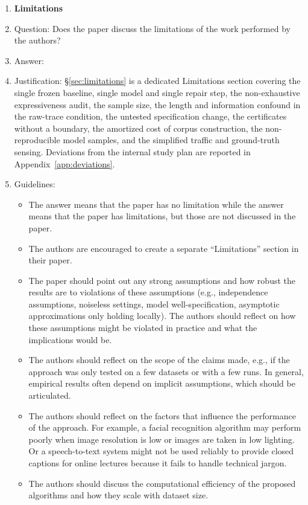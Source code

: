 \begin{enumerate}
\item {\bf Limitations}
    \item[] Question: Does the paper discuss the limitations of the work performed by the authors?
    \item[] Answer: \answerYes{}
    \item[] Justification: \S\ref{sec:limitations} is a dedicated Limitations section covering the single frozen baseline, single model and single repair step, the non-exhaustive expressiveness audit, the sample size, the length and information confound in the raw-trace condition, the untested specification change, the certificates without a boundary, the amortized cost of corpus construction, the non-reproducible model samples, and the simplified traffic and ground-truth sensing. Deviations from the internal study plan are reported in Appendix~\ref{app:deviations}.
    \item[] Guidelines:
    \begin{itemize}
        \item The answer \answerNA{} means that the paper has no limitation while the answer \answerNo{} means that the paper has limitations, but those are not discussed in the paper.
        \item The authors are encouraged to create a separate ``Limitations'' section in their paper.
        \item The paper should point out any strong assumptions and how robust the results are to violations of these assumptions (e.g., independence assumptions, noiseless settings, model well-specification, asymptotic approximations only holding locally). The authors should reflect on how these assumptions might be violated in practice and what the implications would be.
        \item The authors should reflect on the scope of the claims made, e.g., if the approach was only tested on a few datasets or with a few runs. In general, empirical results often depend on implicit assumptions, which should be articulated.
        \item The authors should reflect on the factors that influence the performance of the approach. For example, a facial recognition algorithm may perform poorly when image resolution is low or images are taken in low lighting. Or a speech-to-text system might not be used reliably to provide closed captions for online lectures because it fails to handle technical jargon.
        \item The authors should discuss the computational efficiency of the proposed algorithms and how they scale with dataset size.

\end{itemize}
\end{enumerate}

